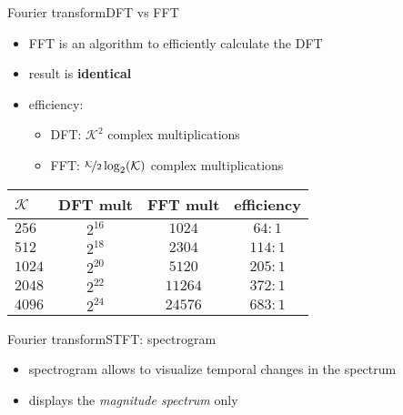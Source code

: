 	\begin{frame}{Fourier transform}{DFT vs FFT}
        \begin{itemize}
            \item   FFT is an algorithm to efficiently calculate the DFT
            \item   result is \textbf{identical}
            \item   efficiency:
                \begin{itemize}
                    \item   DFT: $\mathcal{K}^2$ complex multiplications
                    \item   FFT: $\nicefrac{\mathcal{K}}{2}\log_2(\mathcal{K})$ complex multiplications
                \end{itemize}
        \end{itemize}
        
        \begin{table}
            \centering
                \begin{tabular}{l|ccc}
                    $\mathcal{K}$  & DFT mult & FFT mult & efficiency\\ \hline
                    
                    $256$ & $2^{16}$ & $1024$ & $64:1$\\
                    $512$ & $2^{18}$ & $2304$ & $114:1$\\
                    $1024$ & $2^{20}$ & $5120$ & $205:1$\\
                    $2048$ & $2^{22}$ & $11264$ & $372:1$\\
                    $4096$ & $2^{24}$ & $24576$ & $683:1$\\
                \end{tabular}
        \end{table}
	\end{frame}	

	\begin{frame}{Fourier transform}{STFT: spectrogram}
           \vspace{-2mm}
            \begin{itemize}
                \item   spectrogram allows to visualize temporal changes in the spectrum
                \item   displays the \textit{magnitude spectrum }only
            \end{itemize}
            \vspace{-8mm}
            \begin{columns}
                    \begin{figure}
                    \end{figure}
            \end{columns}
	\end{frame}	

